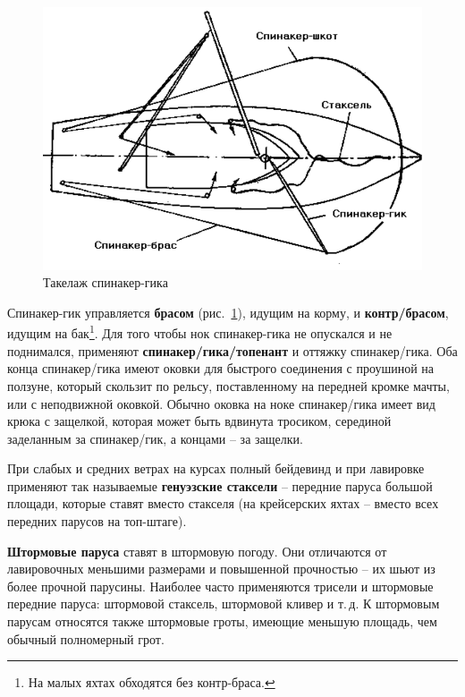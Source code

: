 \documentclass[a4paper, 12pt, twoside, final]{scrbook}
\begin{document}
\begin{figure}[htbp] %
   \centering
   \includegraphics{48_takelazh_spinaker-gika} 
   \caption{Такелаж спинакер-гика}
   \label{fig:48}
\end{figure}

Спинакер-гик управляется \textbf{брасом} (рис.~\ref{fig:48}), идущим на корму, и \textbf{контр\-/брасом}, идущим на бак\footnote{На малых яхтах обходятся без контр-браса.}. Для того чтобы нок спинакер-гика не опускался и не поднимался, применяют \textbf{спинакер\-/гика\-/топенант} и оттяжку спинакер\-/гика. Оба конца спинакер\-/гика имеют оковки для быстрого соединения с проушиной на ползуне, который скользит по рельсу, поставленному на передней кромке мачты, или с неподвижной оковкой. Обычно оковка на ноке спинакер\-/гика имеет вид крюка с защелкой, которая может быть вдвинута тросиком, серединой заделанным за спинакер\-/гик, а концами \--- за защелки.

При слабых и средних ветрах на курсах полный бейдевинд и при лавировке применяют так называемые \textbf{генуэзские стаксели} \--- передние паруса большой площади, которые ставят вместо стакселя (на крейсерских яхтах \--- вместо всех передних парусов на топ-штаге).

\textbf{Штормовые паруса} ставят в штормовую погоду. Они отличаются от лавировочных меньшими размерами и повышенной прочностью \--- их шьют из более прочной парусины. Наиболее часто применяются трисели и штормовые передние паруса: штормовой стаксель, штормовой кливер и т.\,д. К штормовым парусам относятся также штормовые гроты, имеющие меньшую площадь, чем обычный полномерный грот.
\end{document}
